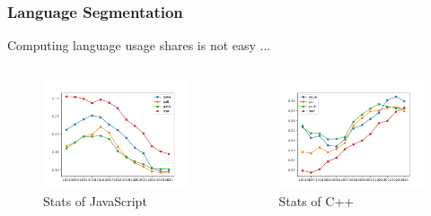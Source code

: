 \documentclass[dvipsnames, 10pt]{beamer}
\begin{document}
\begin{frame}
  \frametitle{Language Segmentation}
  Computing language usage shares is not easy ...
  \begin{columns}
    \begin{column}{0.5\textwidth}
      \begin{figure}
        \begin{center}
          \includegraphics[width=1.0\textwidth]{figures/githut/JavaScript.png}
          \caption{Stats of JavaScript}
        \end{center}
      \end{figure}
    \end{column}
    \begin{column}{0.5\textwidth}
      \begin{figure}
        \begin{center}
          \includegraphics[width=1.0\textwidth]{figures/githut/C++.png}
          \caption{Stats of C++}
        \end{center}
      \end{figure}
    \end{column}
  \end{columns}
\end{frame}
\end{document}
